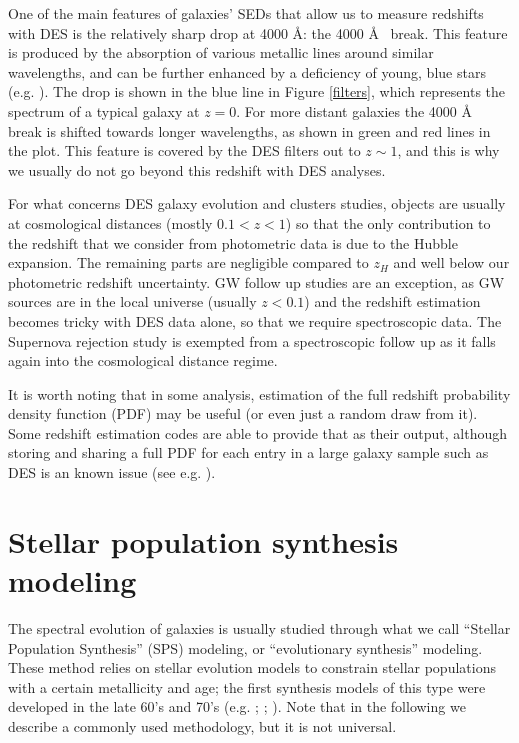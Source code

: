One of the main features of galaxies' SEDs that allow us to measure redshifts with DES is the relatively sharp drop at 4000 \AA: the 4000 \AA~ break. This feature is produced by the absorption of various metallic lines around similar wavelengths, and can be further enhanced by a deficiency of young, blue stars (e.g. \citealt{1985ApJ...297..371H}). The drop is shown in the blue line in Figure \ref{filters}, which represents the spectrum of a typical galaxy at $z=0$. For more distant galaxies the 4000 \AA~ break is shifted towards longer wavelengths, as shown in green and red lines in the plot. This feature is covered by the DES filters out to $z\sim 1$, and this is why we usually do not go beyond this redshift with DES analyses.

For what concerns DES galaxy evolution and clusters studies, objects are usually at cosmological distances (mostly $0.1<z<1$) so that the only contribution to the redshift that we consider from photometric data is due to the Hubble expansion. The remaining parts are negligible compared to $z_H$ and well below our photometric redshift uncertainty. GW follow up studies are an exception, as GW sources are in the local universe (usually $z<0.1$) and the redshift estimation becomes tricky with DES data alone, so that we require spectroscopic data. The Supernova rejection study is exempted from a spectroscopic follow up as it falls again into the cosmological distance regime.

It is worth noting that in some analysis, estimation of the full redshift probability density function (PDF) may be useful (or even just a random draw from it). Some redshift estimation codes are able to provide that as their output, although storing and sharing a full PDF for each entry in a large galaxy sample such as DES is an known issue (see e.g. \citealt{rau}).

\section{Stellar population synthesis modeling}\label{sec:SPS}
The spectral evolution of galaxies is usually studied through what we call ``Stellar Population Synthesis'' (SPS) modeling, or ``evolutionary synthesis'' modeling. These method relies on stellar evolution models to constrain stellar populations with a certain metallicity and age; the first synthesis models of this type were developed in the late 60's and 70's (e.g. \citealt{tinsley}; \citealt{tinsley72}; \citealt{searle}).  Note that in the following we describe a commonly used methodology, but it is not universal. 

